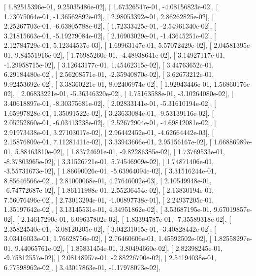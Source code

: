 \documentclass{article}
\begin{document}
       [  1.82515396e-01,   9.25035486e-02],
       [  1.67326547e-01,  -4.08156823e-02],
       [  1.73075064e-01,  -1.36562892e-02],
       [  2.98053392e-01,   2.86262825e-02],
       [  2.25267703e-01,  -6.63805788e-02],
       [  1.72333425e-01,  -2.54961340e-02],
       [  3.21815663e-01,  -5.19279084e-02],
       [  2.16903029e-01,  -1.43645251e-02],
       [  2.12784729e-01,   5.12344537e-03],
       [  1.69963147e-01,   5.57072429e-02],
       [  2.04581395e-01,   9.84551916e-02],
       [  1.76985260e-01,  -4.48938641e-02],
       [  3.14927117e-01,  -1.29958715e-02],
       [  3.12643177e-01,   1.45462315e-02],
       [  3.44763652e-01,   6.29184480e-02],
       [  2.56208571e-01,  -2.35940870e-02],
       [  3.62673212e-01,   9.92453692e-02],
       [  3.38360221e-01,   8.02406974e-02],
       [  1.92943446e-01,   1.56860176e-02],
       [  2.06833221e-01,  -5.36346320e-02],
       [  1.75163588e-01,  -3.10264080e-02],
       [  3.40618897e-01,  -8.30375681e-02],
       [  2.02833141e-01,  -5.31610194e-02],
       [  1.65997828e-01,   1.35091522e-02],
       [  3.23633084e-01,  -9.53139116e-02],
       [  2.05252860e-01,  -6.03413238e-02],
       [  2.52672904e-01,  -4.69812081e-02],
       [  2.91973438e-01,   3.27103017e-02],
       [  2.96442452e-01,  -4.62664442e-03],
       [  2.15876809e-01,   7.11281411e-02],
       [  3.33943666e-01,   2.95156167e-02],
       [  1.66886989e-01,   5.88463810e-02],
       [  1.83724691e-01,  -9.82286385e-02],
       [  1.73769533e-01,  -8.37803965e-02],
       [  3.31526721e-01,   5.74546909e-02],
       [  1.74871406e-01,  -3.55731673e-02],
       [  1.86690026e-01,  -5.63964094e-02],
       [  3.31516244e-01,   8.85646566e-02],
       [  2.81000068e-01,   4.27646002e-03],
       [  2.10549948e-01,  -6.74772687e-02],
       [  1.86111988e-01,   2.55236454e-02],
       [  2.13830194e-01,   7.56076496e-02],
       [  2.73013294e-01,  -1.00897738e-01],
       [  2.24937205e-01,   1.35197642e-02],
       [  3.13145531e-01,   4.34951862e-02],
       [  3.53687195e-01,   9.67019857e-02],
       [  2.14617290e-01,   6.09637802e-02],
       [  1.83394787e-01,  -7.35589318e-02],
       [  2.35824540e-01,  -3.08120205e-02],
       [  3.04231015e-01,  -3.40828442e-02],
       [  3.03416033e-01,   1.76628756e-02],
       [  2.76460606e-01,   1.45592502e-02],
       [  1.82558297e-01,   9.44065761e-02],
       [  1.85831454e-01,   3.80494660e-02],
       [  2.82398245e-01,  -9.75812557e-02],
       [  2.08148957e-01,  -2.88226700e-02],
       [  2.54194038e-01,   6.77598962e-02],
       [  3.43017863e-01,  -1.17978073e-02],
\end{document}
